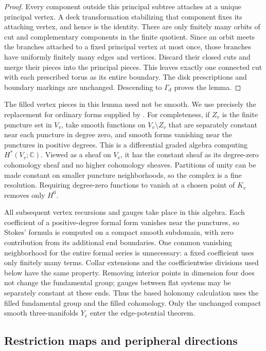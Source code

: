 \begin{proof}
Every component outside this principal subtree attaches at a unique
principal vertex.  A deck transformation stabilizing that component
fixes its attaching vertex, and hence is the identity.  There are only
finitely many orbits of cut and complementary components in the finite
quotient.  Since an orbit meets the branches attached to a fixed
principal vertex at most once, those branches have uniformly finitely
many edges and vertices.  Discard their closed cuts and merge their
pieces into the principal pieces.  This leaves exactly one connected
cut with each prescribed torus as its entire boundary.  The disk
prescriptions and boundary markings are unchanged.  Descending to
$\Gamma_d$ proves the lemma.
\end{proof}

The filled vertex pieces in this lemma need not be smooth.  We use
precisely the replacement for ordinary forms supplied by
\cite[Lemma~2.4]{PD}.  For completeness, if $Z_v$ is the finite puncture
set in $V_v$, take smooth functions on $V_v\setminus Z_v$ that are
separately constant near each puncture in degree zero, and smooth forms
vanishing near the punctures in positive degrees.  This is a
differential graded algebra computing $H^*(V_v;\mathbb C)$.  Viewed as
a sheaf on $V_v$, it has the constant sheaf as its degree-zero
cohomology sheaf and no higher cohomology sheaves.  Partitions of unity
can be made constant on smaller puncture neighborhoods, so the complex
is a fine resolution.  Requiring degree-zero functions to vanish at a
chosen point of $K_v$ removes only $H^0$.

All subsequent vertex recursions and gauges take place in this
algebra.  Each coefficient of a positive-degree formal form vanishes
near the punctures, so Stokes' formula is computed on a compact smooth
subdomain, with zero contribution from its additional end boundaries.
One common vanishing neighborhood for the entire formal series is
unnecessary: a fixed coefficient uses only finitely many terms.
Collar extensions and the coefficientwise divisions used below have
the same property.  Removing interior points in dimension four does
not change the fundamental group; gauges between flat systems may be
separately constant at these ends.  Thus the based holonomy calculation
uses the filled fundamental group and the filled cohomology.  Only the
unchanged compact smooth three-manifolds $Y_e$ enter the edge-potential
theorem.

\subsection{Restriction maps and peripheral directions}

